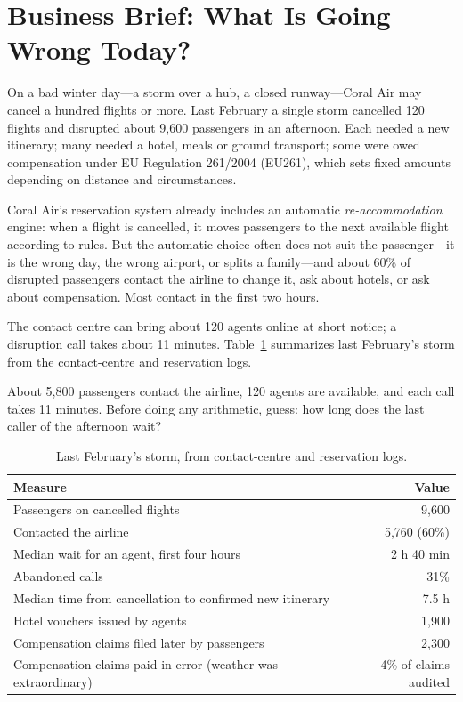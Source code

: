 \section{Business Brief: What Is Going Wrong Today?}
\label{sec:air-brief}

On a bad winter day---a storm over a hub, a closed runway---Coral Air may cancel a hundred flights or more. Last February a single storm cancelled 120 flights and disrupted about 9{,}600 passengers in an afternoon. Each needed a new itinerary; many needed a hotel, meals or ground transport; some were owed compensation under EU Regulation 261/2004 (EU261), which sets fixed amounts depending on distance and circumstances.

Coral Air's reservation system already includes an automatic \emph{re-accommodation} engine: when a flight is cancelled, it moves passengers to the next available flight according to rules. But the automatic choice often does not suit the passenger---it is the wrong day, the wrong airport, or splits a family---and about 60\% of disrupted passengers contact the airline to change it, ask about hotels, or ask about compensation. Most contact in the first two hours.

The contact centre can bring about 120 agents online at short notice; a disruption call takes about 11 minutes. Table~\ref{tab:air-today} summarizes last February's storm from the contact-centre and reservation logs.

\begin{thinkabout}
About 5{,}800 passengers contact the airline, 120 agents are available, and each call takes 11 minutes. Before doing any arithmetic, guess: how long does the last caller of the afternoon wait?
\end{thinkabout}

\begin{table}[htbp]
\centering
\small
\caption{Last February's storm, from contact-centre and reservation logs.}
\label{tab:air-today}
\begin{tabular}{@{}lr@{}}
\toprule
\rowcolor{coHead} Measure & Value \\
\midrule
Passengers on cancelled flights & 9{,}600 \\
Contacted the airline & 5{,}760 (60\%) \\
Median wait for an agent, first four hours & 2 h 40 min \\
Abandoned calls & 31\% \\
Median time from cancellation to confirmed new itinerary & 7.5 h \\
Hotel vouchers issued by agents & 1{,}900 \\
Compensation claims filed later by passengers & 2{,}300 \\
Compensation claims paid in error (weather was extraordinary) & 4\% of claims audited \\
\bottomrule
\end{tabular}
\end{table}


